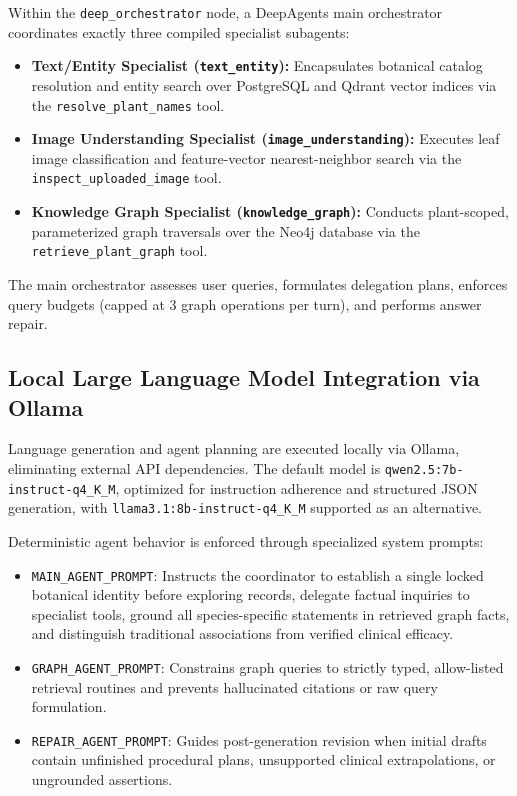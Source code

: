 Within the \texttt{deep\_orchestrator} node, a DeepAgents main orchestrator coordinates exactly three compiled specialist subagents:
\begin{itemize}
    \item \textbf{Text/Entity Specialist (\texttt{text\_entity}):} Encapsulates botanical catalog resolution and entity search over PostgreSQL and Qdrant vector indices via the \texttt{resolve\_plant\_names} tool.
    \item \textbf{Image Understanding Specialist (\texttt{image\_understanding}):} Executes leaf image classification and feature-vector nearest-neighbor search via the \texttt{inspect\_uploaded\_image} tool.
    \item \textbf{Knowledge Graph Specialist (\texttt{knowledge\_graph}):} Conducts plant-scoped, parameterized graph traversals over the Neo4j database via the \texttt{retrieve\_plant\_graph} tool.
\end{itemize}

The main orchestrator assesses user queries, formulates delegation plans, enforces query budgets (capped at 3 graph operations per turn), and performs answer repair.

\subsection{Local Large Language Model Integration via Ollama}

Language generation and agent planning are executed locally via Ollama, eliminating external API dependencies. The default model is \texttt{qwen2.5:7b-instruct-q4\_K\_M}, optimized for instruction adherence and structured JSON generation, with \texttt{llama3.1:8b-instruct-q4\_K\_M} supported as an alternative.

Deterministic agent behavior is enforced through specialized system prompts:
\begin{itemize}
    \item \texttt{MAIN\_AGENT\_PROMPT}: Instructs the coordinator to establish a single locked botanical identity before exploring records, delegate factual inquiries to specialist tools, ground all species-specific statements in retrieved graph facts, and distinguish traditional associations from verified clinical efficacy.
    \item \texttt{GRAPH\_AGENT\_PROMPT}: Constrains graph queries to strictly typed, allow-listed retrieval routines and prevents hallucinated citations or raw query formulation.
    \item \texttt{REPAIR\_AGENT\_PROMPT}: Guides post-generation revision when initial drafts contain unfinished procedural plans, unsupported clinical extrapolations, or ungrounded assertions.
\end{itemize}

